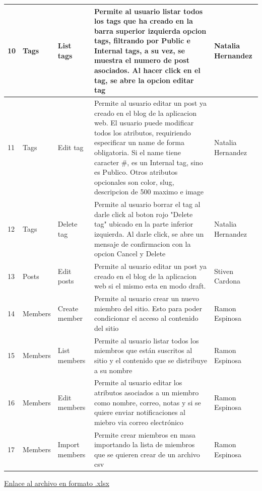 \documentclass[report,12pt]{article}
\begin{document}
\begin{longtable}{|p{0.5cm}|p{1.5cm}|p{2cm}|p{6.5cm}|p{3cm}|}
    \hline
    10 & Tags & List tags & Permite al usuario  listar todos los tags que ha creado en la barra superior izquierda opcion tags, filtrando por Public e Internal tags, a su vez, se muestra el numero de post asociados. Al hacer click en el tag, se abre la opcion editar tag & Natalia Hernandez \\
    \hline
    11 & Tags & Edit tag & Permite al usuario editar un post ya creado en el blog de la aplicacion web. El usuario puede modificar todos los atributos, requiriendo especificar un name de forma obligatoria. Si el name tiene caracter \#, es un Internal tag, sino es Publico. Otros atributos opcionales son color, slug, descripcion de 500 maximo e image & Natalia Hernandez \\
    \hline
    12 & Tags & Delete tag & Permite al usuario borrar el tag al darle click al boton  rojo "Delete tag" ubicado en la parte inferior izquierda. Al darle click, se abre un mensaje de confirmacion con la opcion Cancel y Delete & Natalia Hernandez \\
    \hline
    13 & Posts & Edit posts & Permite al usuario editar un post ya creado en el blog de la aplicacion web si el mismo esta en modo draft. & Stiven Cardona \\
    \hline
    14 & Members & Create member & Permite al usuario crear un nuevo miembro del sitio. Esto para poder condicionar el acceso al contenido del sitio & Ramon Espinosa \\
    \hline
    15 & Members & List members & Permite al usuario listar todos los miembros que están suscritos al sitio y el contenido que se distribuye a su nombre & Ramon Espinosa \\
    \hline
    16 & Members & Edit members & Permite al usuario editar los atributos asociados a un miembro como nombre, correo, notas y si se quiere enviar notificaciones al miebro via correo electrónico & Ramon Espinosa \\
    \hline
    17 & Members & Import members & Permite crear miembros en masa importando la lista de miembros que se quieren crear de un archivo csv & Ramon Espinosa \\
    \hline
\end{longtable}

\href{https://docs.google.com/spreadsheets/d/1AW5Uuod1t0fUaCuIDGt3VsMxNsfL1ElC/edit?usp=sharing&ouid=113118362463883688087&rtpof=true&sd=true}{Enlace al archivo en formato .xlsx}
\end{document}
